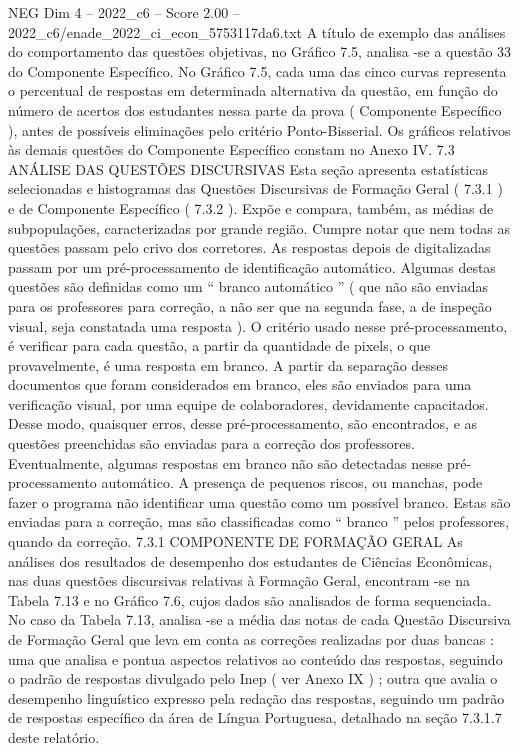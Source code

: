 \begin{textsample}{NEG Dim 4 – 2022\_c6 – Score 2.00 – 2022\_c6/enade\_2022\_ci\_econ\_5753117da6.txt}
A título de exemplo das análises do comportamento das questões objetivas, no Gráfico 7.5, analisa -se a questão 33 do Componente Específico.
No Gráfico 7.5, cada uma das cinco curvas representa o percentual de respostas em determinada alternativa da questão, em função do número de acertos dos estudantes nessa parte da prova ( Componente Específico ), antes de possíveis eliminações pelo critério Ponto-Bisserial.
Os gráficos relativos às demais questões do Componente Específico constam no Anexo IV. 7.3 ANÁLISE DAS QUESTÕES DISCURSIVAS Esta seção apresenta estatísticas selecionadas e histogramas das Questões Discursivas de Formação Geral ( 7.3.1 ) e de Componente Específico ( 7.3.2 ).
Expõe e compara, também, as médias de subpopulações, caracterizadas por grande região.
Cumpre notar que nem todas as questões passam pelo crivo dos corretores.
As respostas depois de digitalizadas passam por um pré-processamento de identificação automático.
Algumas destas questões são definidas como um “ branco automático ” ( que não são enviadas para os professores para correção, a não ser que na segunda fase, a de inspeção visual, seja constatada uma resposta ).
O critério usado nesse pré-processamento, é verificar para cada questão, a partir da quantidade de pixels, o que provavelmente, é uma resposta em branco.
A partir da separação desses documentos que foram considerados em branco, eles são enviados para uma verificação visual, por uma equipe de colaboradores, devidamente capacitados.
Desse modo, quaisquer erros, desse pré-processamento, são encontrados, e as questões preenchidas são enviadas para a correção dos professores.
Eventualmente, algumas respostas em branco não são detectadas nesse pré-processamento automático.
A presença de pequenos riscos, ou manchas, pode fazer o programa não identificar uma questão como um possível branco.
Estas são enviadas para a correção, mas são classificadas como “ branco ” pelos professores, quando da correção. 7.3.1 COMPONENTE DE FORMAÇÃO GERAL As análises dos resultados de desempenho dos estudantes de Ciências Econômicas, nas duas questões discursivas relativas à Formação Geral, encontram -se na Tabela 7.13 e no Gráfico 7.6, cujos dados são analisados de forma sequenciada.
No caso da Tabela 7.13, analisa -se a média das notas de cada Questão Discursiva de Formação Geral que leva em conta as correções realizadas por duas bancas : uma que analisa e pontua aspectos relativos ao conteúdo das respostas, seguindo o padrão de respostas divulgado pelo Inep ( ver Anexo IX ) ; outra que avalia o desempenho linguístico expresso pela redação das respostas, seguindo um padrão de respostas específico da área de Língua Portuguesa, detalhado na seção 7.3.1.7 deste relatório.

\end{textsample}
